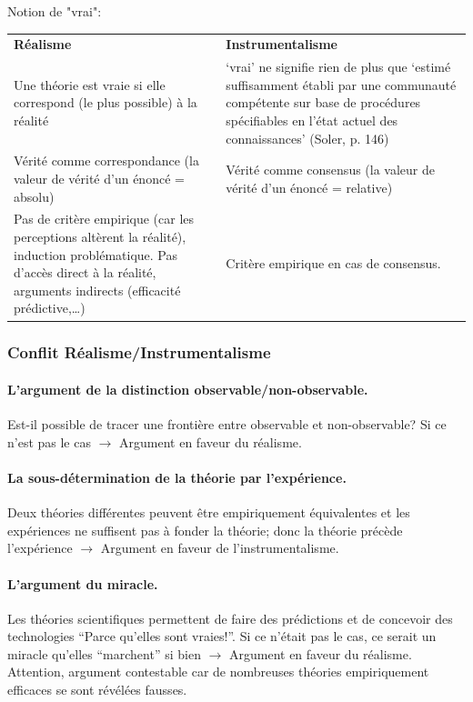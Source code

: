 \documentclass{report}
\begin{document}
	Notion de "vrai":
	\begin{center}
		\begin{tabular}{|p{}|p{}|}
			\hline \textbf{Réalisme} & \textbf{Instrumentalisme}\\
			\hhline{|=|=|} Une théorie est vraie si elle correspond (le plus possible) à la réalité & \og ‘vrai’ ne signifie rien de plus que ‘estimé suffisamment établi par une communauté compétente sur base de procédures spécifiables en l’état actuel des connaissances’ \fg (Soler, p. 146) \\
			\hline Vérité comme correspondance (la valeur de vérité d’un énoncé = absolu) &  Vérité comme consensus (la valeur de vérité d’un énoncé = relative) \\
			\hline Pas de critère empirique (car les perceptions altèrent la réalité), induction problématique. Pas d'accès direct à la réalité, arguments indirects (efficacité prédictive,\dots) & Critère empirique en cas de consensus. \\
			\hline
		\end{tabular}
	\end{center}
	
	\subsubsection{Conflit Réalisme/Instrumentalisme}
	
	\paragraph{L’argument de la distinction observable/non-observable.} Est-il possible de tracer une frontière entre observable et non-observable? Si ce n’est pas le cas $\rightarrow$ Argument en faveur du réalisme.
	
	\paragraph{La sous-détermination de la théorie par l’expérience.} Deux théories différentes peuvent être empiriquement équivalentes et les expériences ne suffisent pas à fonder la théorie; donc la théorie précède l’expérience $\rightarrow$ Argument en faveur de l’instrumentalisme.
	
	\paragraph{L’argument du miracle.} Les théories scientifiques permettent de faire des prédictions et de concevoir des technologies “Parce qu’elles sont vraies!”. Si ce n’était pas le cas, ce serait un miracle qu’elles “marchent” si bien $\rightarrow$ Argument en faveur du réalisme. Attention, argument contestable car de nombreuses théories empiriquement efficaces se sont révélées fausses.
	
\end{document}
